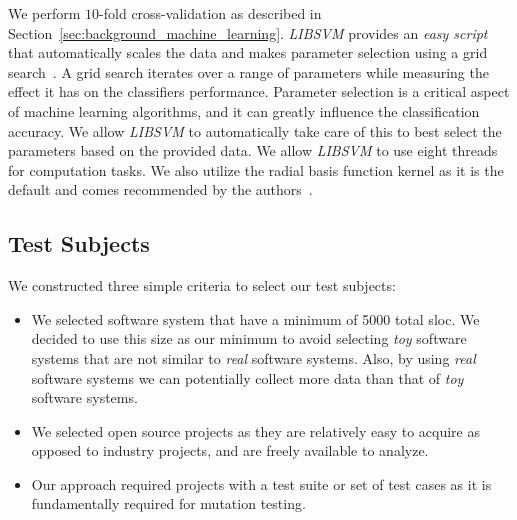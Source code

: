 We perform $10$-fold cross-validation as described in Section~\ref{sec:background_machine_learning}. \emph{LIBSVM} provides an \emph{easy script} that automatically scales the data and makes parameter selection using a grid search~\cite{HCL03}. A grid search iterates over a range of parameters while measuring the effect it has on the classifiers performance. Parameter selection is a critical aspect of machine learning algorithms, and it can greatly influence the classification accuracy. We allow \emph{LIBSVM} to automatically take care of this to best select the parameters based on the provided data. We allow \emph{LIBSVM} to use eight threads for computation tasks. We also utilize the radial basis function kernel as it is the default and comes recommended by the authors~\cite{HCL03}.

\subsection{Test Subjects}
\label{subsec:experiment_test_subjects}
We constructed three simple criteria to select our test subjects:

\begin{itemize}
  \item We selected software system that have a minimum of 5000 total \gls{sloc}. We decided to use this size as our minimum to avoid selecting \emph{toy} software systems that are not similar to \emph{real} software systems. Also, by using \emph{real} software systems we can potentially collect more data than that of \emph{toy} software systems.
  \item We selected open source projects as they are relatively easy to acquire as opposed to industry projects, and are freely available to analyze.
  \item Our approach required projects with a test suite or set of test cases as it is fundamentally required for mutation testing.
\end{itemize}

